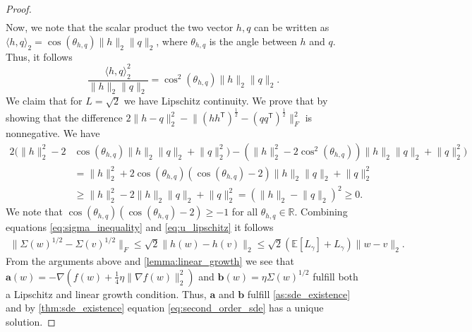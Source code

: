 \documentclass[12pt]{article}
\theoremstyle{definition}
\numberwithin{equation}{section}
\newcommand{\R}{\mathbb{R}}
\newcommand{\T}{\mathsf{T}}
\newcommand{\ev}[1]{\mathbb{E}\left[{#1}\right]}
\newcommand{\norm}[1]{\lVert{#1}\rVert_2}
\newcommand{\normf}[1]{\lVert{#1}\rVert_F}
\newcommand{\scp}[2]{\langle{#1}, {#2}\rangle_2}
\begin{document}
\begin{proof}
\begin{equation}
\begin{split}
    \end{split}
  \end{equation}
  Now, we note that the scalar product the two vector $h,q$ can be written as $\scp{h}{q} = \cos(\theta_{h,q}) \norm{h} \norm{q}$, where $\theta_{h,q}$ is the angle between $h$ and $q$. Thus, it follows
  \begin{equation*}
    \frac{\scp{h}{q}^2}{\norm{h}\norm{q}} = \cos^2(\theta_{h,q})\norm{h}\norm{q}.
  \end{equation*}
  We claim that for $L = \sqrt{2}$ we have Lipschitz continuity. We prove that by showing that the difference $2 \norm{h-q}^2 - \normf{(hh^\T)^{\frac{1}{2}} - (qq^\T)^{\frac{1}{2}}}^2$ is nonnegative. We have
  \begin{align*}
    2 (\norm{h}^2 - 2 &\cos(\theta_{h,q}) \norm{h} \norm{q} + \norm{q}^2) - (\norm{h}^2 - 2 \cos^2(\theta_{h,q})) \norm{h} \norm{q} + \norm{q}^2) \\
    &= \norm{h}^2 + 2 \cos(\theta_{h,q})(\cos(\theta_{h,q}) - 2) \norm{h} \norm{q} + \norm{q}^2 \\
    &\geq \norm{h}^2 - 2\norm{h} \norm{q} + \norm{q}^2 = (\norm{h} - \norm{q})^2 \geq 0.
  \end{align*}
  We note that $\cos(\theta_{h,q})(\cos(\theta_{h,q}) -2 ) \geq -1$ for all $\theta_{h,q} \in \R$.
  Combining equations \eqref{eq:sigma_inequality} and \eqref{eq:u_lipschitz} it follows
  \begin{align*}
    \normf{\Sigma(w)^{1/2} - \Sigma(v)^{1/2}} \leq \sqrt{2}\norm{h(w) - h(v)} \leq \sqrt{2}\left(\ev{L_{\gamma}} + L_{\gamma}\right)\norm{w-v}.
  \end{align*}
  From the arguments above and \autoref{lemma:linear_growth} we see that $\mathbf{a}(w) = -\nabla \left( f(w) + \frac{1}{4}\eta \norm{\nabla f(w)}^2\right)$ and $\mathbf{b}(w) = \eta \Sigma(w)^{1/2}$ fulfill both a Lipschitz and linear growth condition. Thus, $\mathbf{a}$ and $\mathbf{b}$ fulfill \autoref{as:sde_existence} and by \autoref{thm:sde_existence} equation \eqref{eq:second_order_sde} has a unique solution.


\end{proof}
\end{document}
